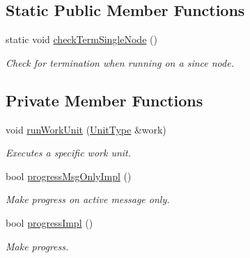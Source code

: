 \subsection*{Static Public Member Functions}
\begin{DoxyCompactItemize}
\item 
static void \hyperlink{structvt_1_1sched_1_1_scheduler_ad1b05fb0d94a3e707d7733ef5206b7c8}{check\+Term\+Single\+Node} ()
\begin{DoxyCompactList}\small\item\em Check for termination when running on a since node. \end{DoxyCompactList}\end{DoxyCompactItemize}
\subsection*{Private Member Functions}
\begin{DoxyCompactItemize}
\item 
void \hyperlink{structvt_1_1sched_1_1_scheduler_ac4d5c3a4baf7a6cb6bdc2e8dc1a3af91}{run\+Work\+Unit} (\hyperlink{structvt_1_1sched_1_1_scheduler_a398229f29b0940cea85aba4bae78b0be}{Unit\+Type} \&work)
\begin{DoxyCompactList}\small\item\em Executes a specific work unit. \end{DoxyCompactList}\item 
bool \hyperlink{structvt_1_1sched_1_1_scheduler_adf3b895d57723f142ff413b3698fdf98}{progress\+Msg\+Only\+Impl} ()
\begin{DoxyCompactList}\small\item\em Make progress on active message only. \end{DoxyCompactList}\item 
bool \hyperlink{structvt_1_1sched_1_1_scheduler_a79ffccdc48af8073122f4de2d17e9d55}{progress\+Impl} ()
\begin{DoxyCompactList}\small\item\em Make progress. \end{DoxyCompactList}\end{DoxyCompactItemize}
